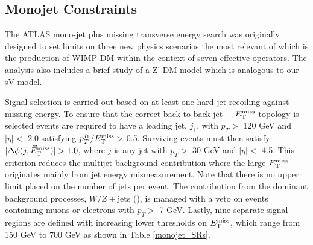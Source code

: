 
\subsection{Monojet Constraints}
\label{monojet_constraints}
The ATLAS mono-jet plus missing transverse energy search \cite{Aad:2015zva} was originally designed to set limits on three new physics scenarios\comm{,}
the most relevant of which is the production of WIMP DM within the context of seven  effective operators. The analysis also includes a brief study of a Z' DM model which is analogous to our sV model.

Signal selection is carried out based on at least one hard jet recoiling against missing energy. To ensure that the correct back-to-back jet + $E_{\mathrm{T}}^{\mathrm{miss}}$ topology is selected events are required to have a leading jet, $j_{1}$, with $p_{T} >$ 120 GeV and $|\eta| <$ 2.0 satisfying $p_{T}^{j_{1}}/E_{\mathrm{T}}^{\mathrm{miss}} >$ 0.5. Surviving events must then satisfy $|\Delta\phi(j,\metvec)|>1.0$, where $j$ is any jet with $p_{T} >$ 30 GeV and $|\eta| <$ 4.5. This criterion reduces the multijet background contribution where the large $E_{\mathrm{T}}^{\mathrm{miss}}$ originates mainly from jet energy mismeasurement. Note that there is no upper limit placed on the number of jets per event. The contribution from the dominant background processes, $W/Z+$jets (), is managed with a veto on events containing muons or electrons with $p_{T}>$ 7 GeV.  Lastly, nine separate signal regions are defined with increasing lower thresholds on $E_{\mathrm{T}}^{\mathrm{miss}}$, which range from 150 GeV to 700 GeV as shown in Table \ref{monojet_SRs}.

